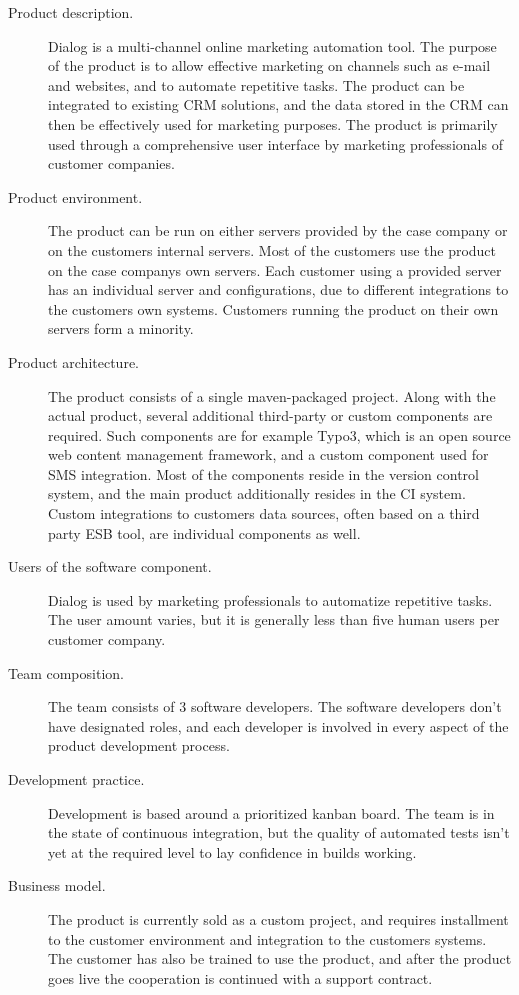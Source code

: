 \documentclass[english]{tktltiki2}
\theoremstyle{definition}
\theoremstyle{remark}
\begin{document}
\begin{description}
  \item[Product description.] Dialog is a multi-channel online marketing automation tool. The purpose of the product is to allow effective marketing on channels such as e-mail and websites, and to automate repetitive tasks. The product can be integrated to existing CRM solutions, and the data stored in the CRM can then be effectively used for marketing purposes. The product is primarily used through a comprehensive user interface by marketing professionals of customer companies. 
  \item[Product environment.] The product can be run on either servers provided by the case company or on the customers internal servers. Most of the customers use the product on the case companys own servers. Each customer using a provided server has an individual server and configurations, due to different integrations to the customers own systems. Customers running the product on their own servers form a minority.
  \item[Product architecture.] The product consists of a single maven-packaged project. Along with the actual product, several additional third-party or custom components are required. Such components are for example Typo3, which is an open source web content management framework, and a custom component used for SMS integration. Most of the components reside in the version control system, and the main product additionally resides in the CI system. Custom integrations to customers data sources, often based on a third party ESB tool, are individual components as well.
  \item[Users of the software component.] Dialog is used by marketing professionals to automatize repetitive tasks. The user amount varies, but it is generally less than five human users per customer company.
  \item[Team composition.] The team consists of 3 software developers. The software developers don't have designated roles, and each developer is involved in every aspect of the product development process.
  \item[Development practice.] Development is based around a prioritized kanban board. The team is in the state of continuous integration, but the quality of automated tests isn't yet at the required level to lay confidence in builds working. 
  \item[Business model.] The product is currently sold as a custom project, and requires installment to the customer environment and integration to the customers systems. The customer has also be trained to use the product, and after the product goes live the cooperation is continued with a support contract.

\end{description}
\end{document}
